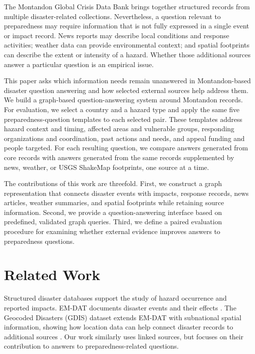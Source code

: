 \documentclass[journal]{IEEEtran}
\begin{document}
The Montandon Global Crisis Data Bank brings together structured
records from multiple disaster-related collections. Nevertheless, a
question relevant to preparedness may require information that is not
fully expressed in a single event or impact record. News reports may
describe local conditions and response activities; weather data can
provide environmental context; and spatial footprints can describe
the extent or intensity of a hazard. Whether those additional sources
answer a particular question is an empirical issue.

This paper asks which information needs remain unanswered in
Montandon-based disaster question answering and how selected external
sources help address them. We build a graph-based question-answering
system around Montandon records. For evaluation, we select a country
and a hazard type and apply the same five preparedness-question
templates to each selected pair. These templates address hazard
context and timing, affected areas and vulnerable groups, responding
organizations and coordination, past actions and needs, and appeal
funding and people targeted. For each resulting question, we compare
answers generated from core records with answers generated from the
same records supplemented by news, weather, or USGS ShakeMap
footprints, one source at a time.

The contributions of this work are threefold. First, we construct a
graph representation that connects disaster events with impacts,
response records, news articles, weather summaries, and spatial
footprints while retaining source information. Second, we provide a
question-answering interface based on predefined, validated graph
queries. Third, we define a paired evaluation procedure for examining
whether external evidence improves answers to preparedness questions.

\section{Related Work}

Structured disaster databases support the study of hazard occurrence
and reported impacts. EM-DAT documents disaster events and their
effects \cite{delforge2025emdat}. The Geocoded Disasters (GDIS)
dataset extends EM-DAT with subnational spatial information, showing
how location data can help connect disaster records to additional
sources \cite{rosvold2021gdis}. Our work similarly uses linked
sources, but focuses on their contribution to answers to
preparedness-related questions.
\end{document}
